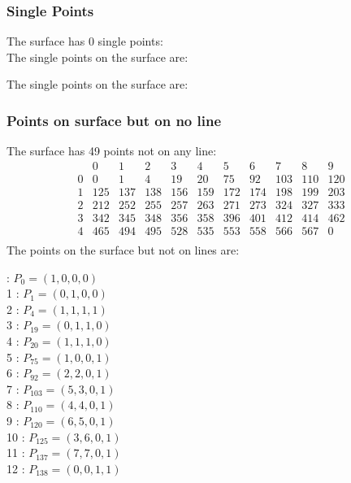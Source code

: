 \documentclass{article}
\begin{document}
{\subsubsection*{Single Points}
The surface has 0 single points:\\
The single points on the surface are:\\
\begin{multicols}{2}
\noindent
\end{multicols}
The single points on the surface are:\\
\subsubsection*{Points on surface but on no line}
The surface has 49 points not on any line:\\
$$
\begin{array}{r|*{10}{r}}
 & 0 & 1 & 2 & 3 & 4 & 5 & 6 & 7 & 8 & 9\\
\hline
0 & 0 & 1 & 4 & 19 & 20 & 75 & 92 & 103 & 110 & 120\\
1 & 125 & 137 & 138 & 156 & 159 & 172 & 174 & 198 & 199 & 203\\
2 & 212 & 252 & 255 & 257 & 263 & 271 & 273 & 324 & 327 & 333\\
3 & 342 & 345 & 348 & 356 & 358 & 396 & 401 & 412 & 414 & 462\\
4 & 465 & 494 & 495 & 528 & 535 & 553 & 558 & 566 & 567 & 0\\
\end{array}
$$
The points on the surface but not on lines are:\\
\begin{multicols}{2}
 : $P_{0}=( 1, 0, 0, 0 )$\\
1 : $P_{1}=( 0, 1, 0, 0 )$\\
2 : $P_{4}=( 1, 1, 1, 1 )$\\
3 : $P_{19}=( 0, 1, 1, 0 )$\\
4 : $P_{20}=( 1, 1, 1, 0 )$\\
5 : $P_{75}=( 1, 0, 0, 1 )$\\
6 : $P_{92}=( 2, 2, 0, 1 )$\\
7 : $P_{103}=( 5, 3, 0, 1 )$\\
8 : $P_{110}=( 4, 4, 0, 1 )$\\
9 : $P_{120}=( 6, 5, 0, 1 )$\\
10 : $P_{125}=( 3, 6, 0, 1 )$\\
11 : $P_{137}=( 7, 7, 0, 1 )$\\
12 : $P_{138}=( 0, 0, 1, 1 )$\\

\end{multicols}}
\end{document}
